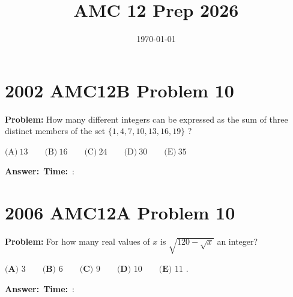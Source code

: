 \documentclass[12pt]{article}
\title{AMC 12 Prep 2026}
\author{}
\date{\today}
\begin{document}
\maketitle

\section{2002 AMC12B Problem 10}

\textbf{Problem:}
How many different integers can be expressed as the sum of three distinct members of the set $\{1,4,7,10,13,16,19\}$ ?

$\text{(A)}\ 13 \qquad \text{(B)}\ 16 \qquad \text{(C)}\ 24 \qquad \text{(D)}\ 30 \qquad \text{(E)}\ 35$

\vspace{0.3cm}
\noindent\textbf{Answer:}~\underline{\hspace{5cm}}\hfill\textbf{Time:}~\underline{\hspace{1.2cm}}:\underline{\hspace{1.2cm}}

\vspace{0.5cm}

\section{2006 AMC12A Problem 10}

\textbf{Problem:}
For how many real values of $x$ is $\sqrt{120-\sqrt{x}}$ an integer?

$\textbf{(A) } 3\qquad \textbf{(B) } 6\qquad \textbf{(C) } 9\qquad \textbf{(D) } 10\qquad \textbf{(E) } 11$ .

\vspace{0.3cm}
\noindent\textbf{Answer:}~\underline{\hspace{5cm}}\hfill\textbf{Time:}~\underline{\hspace{1.2cm}}:\underline{\hspace{1.2cm}}

\vspace{0.5cm}
\end{document}
